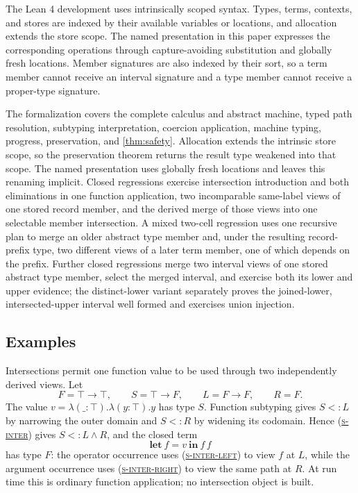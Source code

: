 \documentclass[acmsmall,screen,nonacm]{acmart}
\newcommand{\ruleref}[1]{%
  \textsc{(\hyperref[rule:#1]{#1})}}
\newcommand{\interty}[2]{#1\mathbin{\wedge}#2}
\begin{document}
The Lean 4 development \citep{demoura2021lean4} uses intrinsically scoped
syntax. Types, terms, contexts, and stores are indexed by their available
variables or locations, and allocation extends the store scope. The named
presentation in this paper expresses the corresponding operations through
capture-avoiding substitution and globally fresh locations. Member signatures
are also indexed by their sort, so a term member cannot receive an interval
signature and a type member cannot receive a proper-type signature.

The formalization covers the complete calculus and abstract machine, typed
path resolution, subtyping interpretation, coercion application, machine
typing, progress, preservation, and \cref{thm:safety}. Allocation extends the
intrinsic store scope, so the preservation theorem returns the result type
weakened into that scope. The named presentation uses globally fresh
locations and leaves this renaming implicit. Closed regressions exercise
intersection introduction and both eliminations in one function application,
two incomparable same-label views of one stored record member, and the
derived merge of those views into one selectable member intersection. A
mixed two-cell regression uses one recursive plan to merge an older abstract
type member and, under the resulting record-prefix type, two different views
of a later term member, one of which depends on the prefix. Further closed
regressions merge two interval views of one stored abstract type member,
select the merged interval, and exercise both its lower and upper evidence;
the distinct-lower variant separately proves the joined-lower,
intersected-upper interval well formed and exercises union injection.

\subsection{Examples}

Intersections permit one function value to be used through two independently
derived views. Let
\[
  F=\top\to\top,
  \qquad S=\top\to F,
  \qquad L=F\to F,
  \qquad R=F.
\]
The value \(v=\lambda({\_}:\top).\lambda(y:\top).y\) has type \(S\).
Function subtyping gives \(S<:L\) by narrowing the outer domain and
\(S<:R\) by widening its codomain. Hence \ruleref{s-inter} gives
\(S<:\interty{L}{R}\), and the closed term
\[
  \mathbf{let}\ f=v\ \mathbf{in}\ f\,f
\]
has type \(F\): the operator occurrence uses \ruleref{s-inter-left} to view
\(f\) at \(L\), while the argument occurrence uses
\ruleref{s-inter-right} to view the same path at \(R\). At run time this is
ordinary function application; no intersection object is built.
\end{document}
